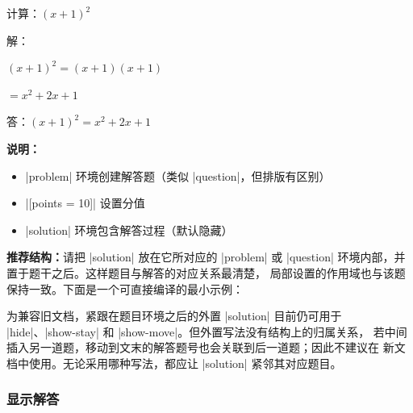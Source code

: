 \begin{latexcode}
  \begin{problem}[points = 10]
    计算：$(x + 1)^2$

    \begin{solution}
      解：

      $(x + 1)^2 = (x + 1)(x + 1)$

      $= x^2 + 2x + 1$

      答：$(x + 1)^2 = x^2 + 2x + 1$
    \end{solution}
  \end{problem}
\end{latexcode}

\textbf{说明：}
\begin{itemize}
  \item |problem| 环境创建解答题（类似 |question|，但排版有区别）
  \item |[points = 10]| 设置分值
  \item |solution| 环境包含解答过程（默认隐藏）
\end{itemize}

\textbf{推荐结构：}请把 |solution| 放在它所对应的 |problem| 或
|question| 环境内部，并置于题干之后。这样题目与解答的对应关系最清楚，
局部设置的作用域也与该题保持一致。下面是一个可直接编译的最小示例：


为兼容旧文档，紧跟在题目环境之后的外置 |solution| 目前仍可用于
|hide|、|show-stay| 和 |show-move|。但外置写法没有结构上的归属关系，
若中间插入另一道题，移动到文末的解答题号也会关联到后一道题；因此不建议在
新文档中使用。无论采用哪种写法，都应让 |solution| 紧邻其对应题目。

\subsubsection{显示解答}

